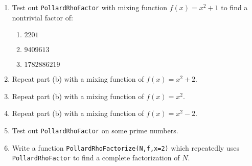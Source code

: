 \documentclass[11pt]{article}
\begin{document}
\begin{enumerate}
{\begin{enumerate}
{    Program an algorithm \verb|PollardRhoFactor(N,f,x = 2)| which implements the algorith described in Problem 4 to find a nontrivial factor of $N$.  It should take as input a large number $N$, a mixing function $f$, and an initial value for the mixing function $x$ (which will initialize to 2 if not given).  It should also print the number $k$ of steps it took to find the nontrivial factor and the ration $\sqrt N/k$ (for our analysis in Problem 4).
    }
    \item{
    Test out \verb|PollardRhoFactor| with mixing function $f(x) = x^2+1$ to find a nontrivial factor of:
    \begin{enumerate}
      \item{$2201$}
      \item{$9409613$}
      \item{$1782886219$}
    \end{enumerate}
    }
    \item{
    Repeat part (b) with a mixing function of $f(x) = x^2+2$.
    }
    \item{
    Repeat part (b) with a mixing function of $f(x) = x^2$.
    }
    \item{
    Repeat part (b) with a mixing function of $f(x) = x^2-2$.
    }
    \item{
    Test out \verb|PollardRhoFactor| on some prime numbers.
    }
    \item{
    Write a function \verb|PollardRhoFactorize(N,f,x=2)| which repeatedly uses \verb|PollardRhoFactor| to find a complete factorization of $N$.
    }
  \end{enumerate}
  }
\end{enumerate}
\end{document}
